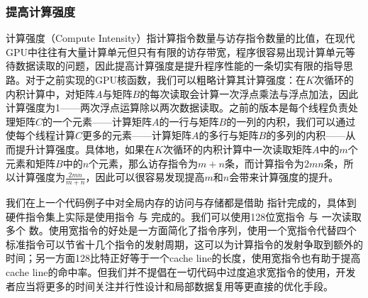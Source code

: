 \documentclass[letterpaper,10pt,english]{sphinxmanual}
\begin{document}
\begin{sphinxVerbatim}[commandchars=\\\{\}]
\end{sphinxVerbatim}


\subsubsection{提高计算强度}
\label{\detokenize{chapter_accelerator/accelerator_practise:id5}}
\sphinxAtStartPar
计算强度（Compute
Intensity）指计算指令数量与访存指令数量的比值，在现代GPU中往往有大量计算单元但只有有限的访存带宽，程序很容易出现计算单元等待数据读取的问题，因此提高计算强度是提升程序性能的一条切实有限的指导思路。对于之前实现的GPU核函数，我们可以粗略计算其计算强度：在\(K\)次循环的内积计算中，对矩阵\(A\)与矩阵\(B\)的每次读取会计算一次浮点乘法与浮点加法，因此计算强度为1——两次浮点运算除以两次数据读取。之前的版本是每个线程负责处理矩阵\(C\)的一个元素——计算矩阵{}{}\(A\)的一行与矩阵\(B\)的一列的内积，我们可以通过使每个线程计算\(C\)更多的元素——计算矩阵\(A\)的多行与矩阵\(B\)的多列的内积——从而提升计算强度。具体地，如果在\(K\)次循环的内积计算中一次读取矩阵\(A\)中的\(m\)个元素和矩阵\(B\)中的\(n\)个元素，那么访存指令为\(m+n\)条，而计算指令为\(2mn\)条，所以计算强度为\(\frac{2mn}{m+n}\)，因此可以很容易发现提高\(m\)和\(n\)会带来计算强度的提升。

\sphinxAtStartPar
我们在上一个代码例子中对全局内存的访问与存储都是借助 
指针完成的，具体到硬件指令集上实际是使用指令  与 
完成的。我们可以使用128位宽指令 与 
一次读取多个 
数。使用宽指令的好处是一方面简化了指令序列，使用一个宽指令代替四个标准指令可以节省十几个指令的发射周期，这可以为计算指令的发射争取到额外的时间；另一方面128比特正好等于一个cache
line的长度，使用宽指令也有助于提高cache
line的命中率。但我们并不提倡在一切代码中过度追求宽指令的使用，开发者应当将更多的时间关注并行性设计和局部数据复用等更直接的优化手段。
\end{document}

